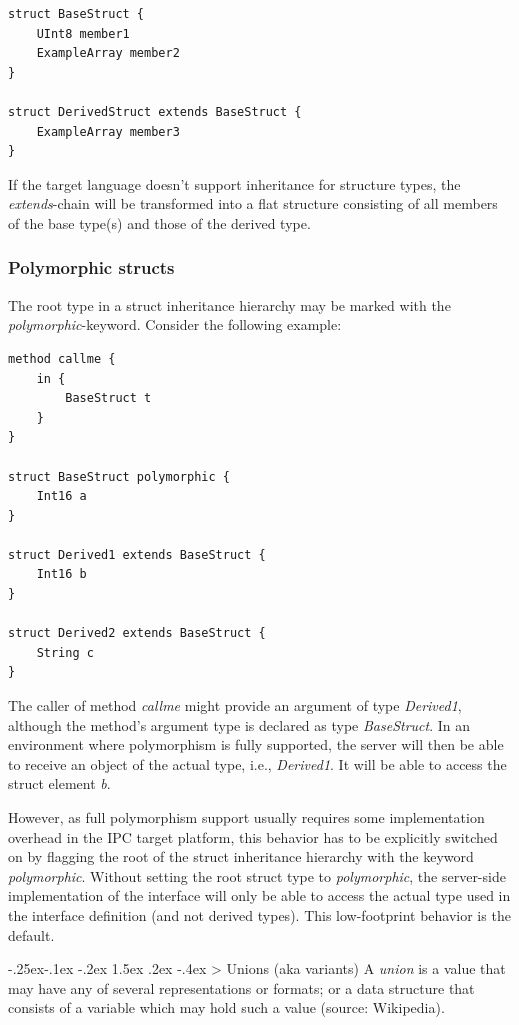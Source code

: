 \documentclass[a4paper,10pt]{scrreprt}
\makeatletter
\renewcommand\subsection{\medskip\@startsection{subsection}{2}{\z@}%
  {-.25ex\@plus -.1ex \@minus -.2ex}%
  {1.5ex \@plus .2ex \@minus -.4ex}%
  {\ifnum \scr@compatibility>\@nameuse{scr@v@2.96}\relax
    \setlength{\parfillskip}{\z@ plus 1fil}\fi
    \raggedsection\normalfont\sectfont\nobreak\size@subsection
  }%
}
\makeatother
\begin{document}
\begin{lstlisting}[language=Franca]
struct BaseStruct {
	UInt8 member1
	ExampleArray member2
}

struct DerivedStruct extends BaseStruct {
	ExampleArray member3
}
\end{lstlisting}

If the target language doesn't support inheritance for structure types, the \textit{extends}-chain
will be transformed into a flat structure consisting of all members of the base
type(s) and those of the derived type.

\subsubsection{Polymorphic structs}
\label{FIDL_Types_Struct_Polymorphic}
The root type in a struct inheritance hierarchy may be marked with the 
\textit{polymorphic}-keyword. Consider the following example:

\begin{lstlisting}[language=Franca]
method callme {
	in {
		BaseStruct t
	}
}

struct BaseStruct polymorphic {
	Int16 a
}

struct Derived1 extends BaseStruct {
	Int16 b
}
	
struct Derived2 extends BaseStruct {
	String c
}
\end{lstlisting}

The caller of method \textit{callme} might provide an argument of type \textit{Derived1},
although the method's argument type is declared as type \textit{BaseStruct}.
In an environment where polymorphism is fully supported, the server will then
be able to receive an object of the actual type, i.e., \textit{Derived1}.
It will be able to access the struct element \textit{b}.

However, as full polymorphism support usually requires some implementation
overhead in the IPC target platform, this behavior has to be explicitly switched
on by flagging the root of the struct inheritance hierarchy with the
keyword \textit{polymorphic}. Without setting the root struct type to \textit{polymorphic},
the server-side implementation of the interface will only be able to access the
actual type used in the interface definition (and not derived types). 
This low-footprint behavior is the default.

\subsection{Unions (aka variants)}
\label{FIDL_Types_Union}
A \textit{union} is a value that may have any of several representations or formats;
or a data structure that consists of a variable which may hold such a value (source: Wikipedia).
\end{document}
